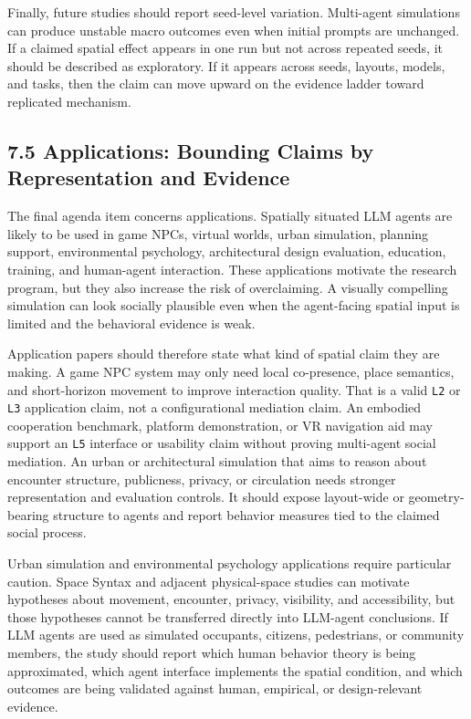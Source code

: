 \documentclass[
  twocolumn]{article}
\begin{document}
Finally, future studies should report seed-level variation. Multi-agent
simulations can produce unstable macro outcomes even when initial
prompts are unchanged. If a claimed spatial effect appears in one run
but not across repeated seeds, it should be described as exploratory. If
it appears across seeds, layouts, models, and tasks, then the claim can
move upward on the evidence ladder toward replicated mechanism.

\subsection{7.5 Applications: Bounding Claims by Representation and
Evidence}\label{applications-bounding-claims-by-representation-and-evidence}

The final agenda item concerns applications. Spatially situated LLM
agents are likely to be used in game NPCs, virtual worlds, urban
simulation, planning support, environmental psychology, architectural
design evaluation, education, training, and human-agent interaction.
These applications motivate the research program, but they also increase
the risk of overclaiming. A visually compelling simulation can look
socially plausible even when the agent-facing spatial input is limited
and the behavioral evidence is weak.

Application papers should therefore state what kind of spatial claim
they are making. A game NPC system may only need local co-presence,
place semantics, and short-horizon movement to improve interaction
quality. That is a valid \texttt{L2} or \texttt{L3} application claim,
not a configurational mediation claim. An embodied cooperation
benchmark, platform demonstration, or VR navigation aid may support an
\texttt{L5} interface or usability claim without proving multi-agent
social mediation. An urban or architectural simulation that aims to
reason about encounter structure, publicness, privacy, or circulation
needs stronger representation and evaluation controls. It should expose
layout-wide or geometry-bearing structure to agents and report behavior
measures tied to the claimed social process.

Urban simulation and environmental psychology applications require
particular caution. Space Syntax and adjacent physical-space studies can
motivate hypotheses about movement, encounter, privacy, visibility, and
accessibility, but those hypotheses cannot be transferred directly into
LLM-agent conclusions. If LLM agents are used as simulated occupants,
citizens, pedestrians, or community members, the study should report
which human behavior theory is being approximated, which agent interface
implements the spatial condition, and which outcomes are being validated
against human, empirical, or design-relevant evidence.
\end{document}
